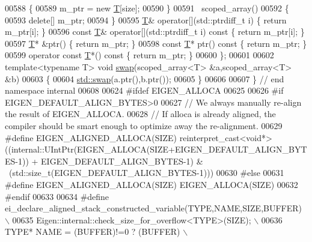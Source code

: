 \begin{DoxyCode}
00588   \{
00589     m\_ptr = \textcolor{keyword}{new} \hyperlink{group___sparse_core___module_class_eigen_1_1_triplet}{T}[size];
00590   \}
00591   ~scoped\_array()
00592   \{
00593     \textcolor{keyword}{delete}[] m\_ptr;
00594   \}
00595   \hyperlink{group___sparse_core___module_class_eigen_1_1_triplet}{T}& operator[](std::ptrdiff\_t i) \{ \textcolor{keywordflow}{return} m\_ptr[i]; \}
00596   \textcolor{keyword}{const} \hyperlink{group___sparse_core___module_class_eigen_1_1_triplet}{T}& operator[](std::ptrdiff\_t i)\textcolor{keyword}{ const }\{ \textcolor{keywordflow}{return} m\_ptr[i]; \}
00597   \hyperlink{group___sparse_core___module_class_eigen_1_1_triplet}{T}* &ptr() \{ \textcolor{keywordflow}{return} m\_ptr; \}
00598   \textcolor{keyword}{const} \hyperlink{group___sparse_core___module_class_eigen_1_1_triplet}{T}* ptr()\textcolor{keyword}{ const }\{ \textcolor{keywordflow}{return} m\_ptr; \}
00599   \textcolor{keyword}{operator} \textcolor{keyword}{const} \hyperlink{group___sparse_core___module_class_eigen_1_1_triplet}{T}*() \textcolor{keyword}{const} \{ \textcolor{keywordflow}{return} m\_ptr; \}
00600 \};
00601 
00602 \textcolor{keyword}{template}<\textcolor{keyword}{typename} T> \textcolor{keywordtype}{void} \hyperlink{endian_8c_a3ca5ecd34b04d6a243c054ac3a57f68d}{swap}(scoped\_array<T> &a,scoped\_array<T> &b)
00603 \{
00604   \hyperlink{endian_8c_a3ca5ecd34b04d6a243c054ac3a57f68d}{std::swap}(a.ptr(),b.ptr());
00605 \}
00606     
00607 \} \textcolor{comment}{// end namespace internal}
00608 
00624 \textcolor{preprocessor}{#ifdef EIGEN\_ALLOCA}
00625   
00626 \textcolor{preprocessor}{  #if EIGEN\_DEFAULT\_ALIGN\_BYTES>0}
00627     \textcolor{comment}{// We always manually re-align the result of EIGEN\_ALLOCA.}
00628     \textcolor{comment}{// If alloca is already aligned, the compiler should be smart enough to optimize away the re-alignment.}
00629 \textcolor{preprocessor}{    #define EIGEN\_ALIGNED\_ALLOCA(SIZE)
       reinterpret\_cast<void*>((internal::UIntPtr(EIGEN\_ALLOCA(SIZE+EIGEN\_DEFAULT\_ALIGN\_BYTES-1)) + EIGEN\_DEFAULT\_ALIGN\_BYTES-1) & ~(std::size\_t(EIGEN\_DEFAULT\_ALIGN\_BYTES-1)))}
00630 \textcolor{preprocessor}{  #else}
00631 \textcolor{preprocessor}{    #define EIGEN\_ALIGNED\_ALLOCA(SIZE) EIGEN\_ALLOCA(SIZE)}
00632 \textcolor{preprocessor}{  #endif}
00633 
00634 \textcolor{preprocessor}{  #define ei\_declare\_aligned\_stack\_constructed\_variable(TYPE,NAME,SIZE,BUFFER) \(\backslash\)}
00635 \textcolor{preprocessor}{    Eigen::internal::check\_size\_for\_overflow<TYPE>(SIZE); \(\backslash\)}
00636 \textcolor{preprocessor}{    TYPE* NAME = (BUFFER)!=0 ? (BUFFER) \(\backslash\)}

\end{DoxyCode}
